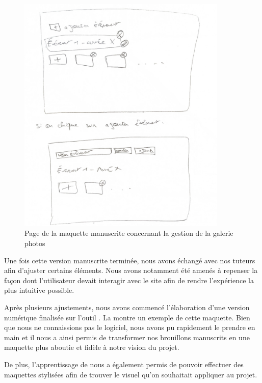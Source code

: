 \begin{figure}[H]
    \centering
    \includegraphics[width=10cm]{assets/pictures/maquette.png}
    \captionsetup{justification=centering}
    \caption{Page de la maquette manuscrite concernant la gestion de la galerie photos}
    \label{manuscrite}%
\end{figure}
\bigskip

Une fois cette version manuscrite terminée, nous avons échangé avec nos tuteurs afin d’ajuster certains éléments.
Nous avons notamment été amenés à repenser la façon dont l'utilisateur devait interagir avec le site afin de rendre l'expérience la plus intuitive possible.

Après plusieurs ajustements, nous
avons commencé l'élaboration d'une version numérique finalisée sur l'outil . La  montre un exemple de cette maquette.
Bien que nous ne connaissions pas le logiciel, nous avons pu rapidement le prendre en main et il nous a ainsi permis de transformer nos brouillons manuscrits en une maquette plus aboutie et fidèle à notre vision du projet.

De plus, l'apprentissage de  nous a également permis de pouvoir effectuer des maquettes stylisées afin de trouver le visuel qu'on souhaitait appliquer au projet.
\bigskip

